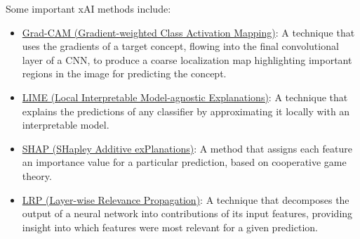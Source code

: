 Some important xAI methods include:
\begin{itemize}
    \item \ul{Grad-CAM (Gradient-weighted Class Activation Mapping)}: A technique that uses the gradients of a target concept, flowing into the final convolutional layer of a CNN, to produce a coarse localization map highlighting important regions in the image for predicting the concept.
    \item \ul{LIME (Local Interpretable Model-agnostic Explanations)}: A technique that explains the predictions of any classifier by approximating it locally with an interpretable model.
    \item \ul{SHAP (SHapley Additive exPlanations)}: A method that assigns each feature an importance value for a particular prediction, based on cooperative game theory.
    \item \ul{LRP (Layer-wise Relevance Propagation)}: A technique that decomposes the output of a neural network into contributions of its input features, providing insight into which features were most relevant for a given prediction.
\end{itemize}